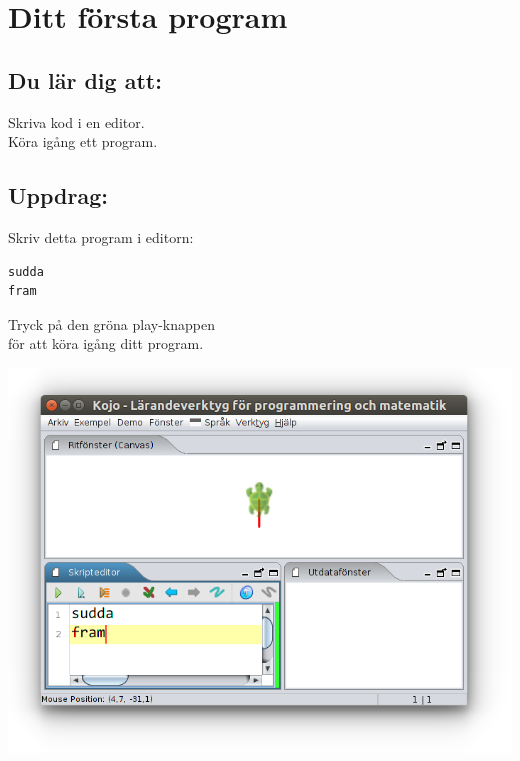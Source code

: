\chapter{Ditt första program}
\begin{multicols}{2}
\section*{\color{MidnightBlue}Du lär dig att:}
Skriva kod i en editor.\\
Köra igång ett program.
\section*{\color{BrickRed}Uppdrag:}
Skriv detta program i editorn:

\begin{lstlisting}[basicstyle={\ttfamily\fontsize{24}{24}\selectfont}]
sudda
fram
\end{lstlisting}
        
Tryck på den gröna play-knappen\\
för att köra igång ditt program.

\columnbreak

\includegraphics[width=14cm]{../img/fram.png}
\end{multicols}

